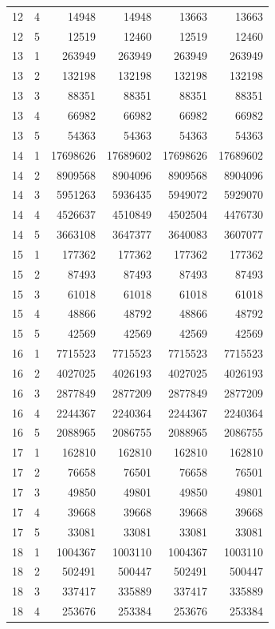 \begin{longtable}{rrrrrr}
12 & 4 & 14948 & 14948 & 13663 & 13663 \\
12 & 5 & 12519 & 12460 & 12519 & 12460 \\
13 & 1 & 263949 & 263949 & 263949 & 263949 \\
13 & 2 & 132198 & 132198 & 132198 & 132198 \\
13 & 3 & 88351 & 88351 & 88351 & 88351 \\
13 & 4 & 66982 & 66982 & 66982 & 66982 \\
13 & 5 & 54363 & 54363 & 54363 & 54363 \\
14 & 1 & 17698626 & 17689602 & 17698626 & 17689602 \\
14 & 2 & 8909568 & 8904096 & 8909568 & 8904096 \\
14 & 3 & 5951263 & 5936435 & 5949072 & 5929070 \\
14 & 4 & 4526637 & 4510849 & 4502504 & 4476730 \\
14 & 5 & 3663108 & 3647377 & 3640083 & 3607077 \\
15 & 1 & 177362 & 177362 & 177362 & 177362 \\
15 & 2 & 87493 & 87493 & 87493 & 87493 \\
15 & 3 & 61018 & 61018 & 61018 & 61018 \\
15 & 4 & 48866 & 48792 & 48866 & 48792 \\
15 & 5 & 42569 & 42569 & 42569 & 42569 \\
16 & 1 & 7715523 & 7715523 & 7715523 & 7715523 \\
16 & 2 & 4027025 & 4026193 & 4027025 & 4026193 \\
16 & 3 & 2877849 & 2877209 & 2877849 & 2877209 \\
16 & 4 & 2244367 & 2240364 & 2244367 & 2240364 \\
16 & 5 & 2088965 & 2086755 & 2088965 & 2086755 \\
17 & 1 & 162810 & 162810 & 162810 & 162810 \\
17 & 2 & 76658 & 76501 & 76658 & 76501 \\
17 & 3 & 49850 & 49801 & 49850 & 49801 \\
17 & 4 & 39668 & 39668 & 39668 & 39668 \\
17 & 5 & 33081 & 33081 & 33081 & 33081 \\
18 & 1 & 1004367 & 1003110 & 1004367 & 1003110 \\
18 & 2 & 502491 & 500447 & 502491 & 500447 \\
18 & 3 & 337417 & 335889 & 337417 & 335889 \\
18 & 4 & 253676 & 253384 & 253676 & 253384 \\

\end{longtable}
